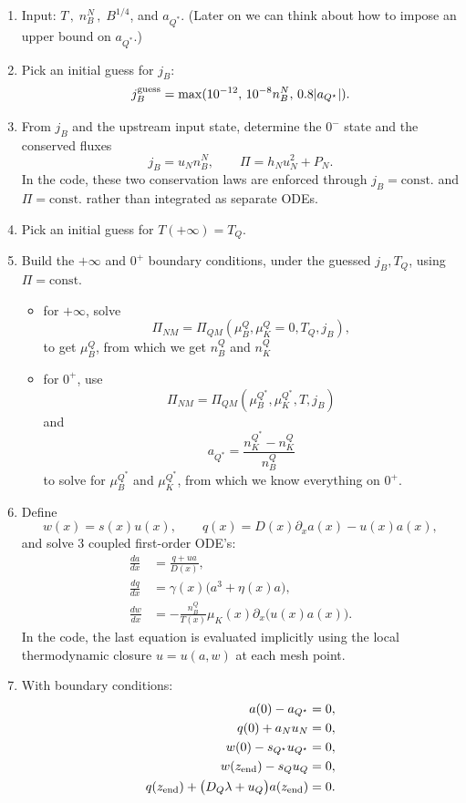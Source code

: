 \documentclass[11pt]{article}
\begin{document}
\begin{enumerate}
\item Input: $T\,,\; n_B^N\,,\; B^{1/4}$, and $a_{Q^\ast}$. (Later on we can think about how to impose an upper bound on $a_{Q^\ast}$.)
\item Pick an initial guess for $j_B$:
\[
j_B^{\rm guess}
=
\max(10^{-12},\,10^{-8}n_B^N,\,0.8 |a_{Q^\star}|).
\]
\item From $j_B$ and the upstream input state, determine the $0^-$ state and the conserved fluxes
\[
j_B = u_N n_B^N,\qquad \Pi = h_N u_N^2 + P_N.
\]
In the code, these two conservation laws are enforced through $j_B=\mathrm{const.}$ and $\Pi=\mathrm{const.}$ rather than integrated as separate ODEs.
\item Pick an initial guess for $T(+\infty) = T_Q$.
\item Build the $+\infty$ and $0^+$ boundary conditions, under the guessed $j_B, T_Q$, using $\Pi = \mathrm{const.}$
\begin{itemize}
\item for $+\infty$, solve
\[
\Pi_{NM} = \Pi_{QM}(\mu_B^Q, \mu_K^Q=0, T_Q, j_B),
\]
to get $\mu_B^Q$, from which we get $n_B^Q$ and $n_K^Q$
\item for $0^+$, use
\[
\Pi_{NM} = \Pi_{QM}(\mu_B^{Q^\ast}, \mu_K^{Q^\ast}, T, j_B)
\]
and
\[
a_{Q^\ast} = \frac{n_K^{Q^\ast} - n_K^Q}{n_B^Q}
\]
to solve for $\mu_B^{Q^\ast}$ and $\mu_K^{Q^\ast}$, from which we know everything on $0^+$.
\end{itemize}
\item Define
\[
w(x) = s(x)u(x),\qquad q(x)=D(x)\partial_x a(x)-u(x)a(x),
\]
and solve 3 coupled first-order ODE's:
\begin{align}
\frac{da}{dx} &= \frac{q+u a}{D(x)},\\
\frac{dq}{dx} &= \gamma(x)\bigl(a^3+\eta(x)a\bigr),\\
\frac{dw}{dx} &= -\frac{n_B^Q}{T(x)}\mu_K(x)\partial_x\Big(u(x) a(x)\Big).
\end{align}
In the code, the last equation is evaluated implicitly using the local thermodynamic closure $u=u(a,w)$ at each mesh point.
\item With boundary conditions:
\begin{align}
a(0)-a_{Q^\star} &= 0,\\
q(0)+a_Nu_N &= 0,\\
w(0)-s_{Q^\star}u_{Q^\star} &= 0,\\
w(z_{\rm end}) - s_Qu_Q &= 0,\\
q(z_{\rm end})+\bigl(D_Q\lambda+u_Q\bigr)a(z_{\rm end}) &= 0.

\end{align}
\end{enumerate}
\end{document}
